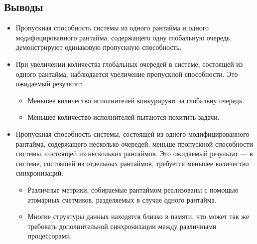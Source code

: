 \subsection{Выводы}

\begin{itemize}
    \item Пропускная способность системы из одного рантайма и одного модифицированного рантайма, содержащего одну глобальную очередь, демонстрируют одинаковую пропускную способность.
    \item При увеличении количества глобальных очередей в системе, состоящей из одного рантайма, наблюдается увеличение пропускной способности. Это ожидаемый результат:
    \begin{itemize}
        \item Меньшее количество исполнителей конкурируют за глобальну очередь.
        \item Меньшее количество исполнителей пытаются похитить задачи.
    \end{itemize}
    \item Пропускная способность системы, состоящей из одного модифицированного рантайма, содержащего несколько очередей, меньше пропускной способности системы, состоящей из нескольких рантаймов. Это ожидаемый результат --- в системе, состоящей из отдельных рантаймов, требуется меньшее количество синхронизаций:
    \begin{itemize}
        \item Различные метрики, собираемые рантаймом реализованы с помощью атомарных счетчиков, разделяемых в случае одного рантайма.
        \item Многие структуры данных находятся близко в памяти, что может так же требовать дополнительной синхронизации между различными процессорами.
    \end{itemize}
\end{itemize}
